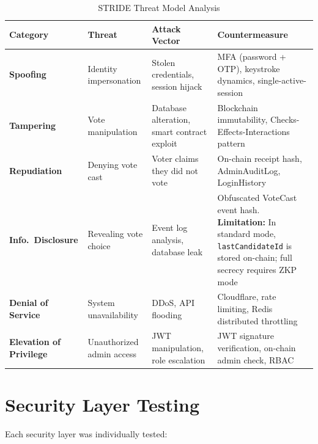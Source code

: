 \documentclass[oneside,a4paper,12pt]{book}
\begin{document}
\FloatBarrier
{}
\begin{table}[htbp]
\centering
\renewcommand{\arraystretch}{1.2}
\small
{}
\begin{tabularx}{\textwidth}{|R|M|M|X|}
\hline
\textbf{Category} & \textbf{Threat} & \textbf{Attack Vector} & \textbf{Countermeasure} \\
\hline
\textbf{Spoofing} & Identity impersonation & Stolen credentials, session hijack & MFA (password + OTP), keystroke dynamics, single-active-session \\
\hline
\textbf{Tampering} & Vote manipulation & Database alteration, smart contract exploit & Blockchain immutability, Checks-Effects-Interactions pattern \\
\hline
\textbf{Repudiation} & Denying vote cast & Voter claims they did not vote & On-chain receipt hash, AdminAuditLog, LoginHistory \\
\hline
\textbf{Info.\ Disclosure} & Revealing vote choice & Event log analysis, database leak & Obfuscated VoteCast event hash. \textbf{Limitation:} In standard mode, \texttt{lastCandidateId} is stored on-chain; full secrecy requires ZKP mode \\
\hline
\textbf{Denial of Service} & System unavailability & DDoS, API flooding & Cloudflare, rate limiting, Redis distributed throttling \\
\hline
\textbf{Elevation of Privilege} & Unauthorized admin access & JWT manipulation, role escalation & JWT signature verification, on-chain admin check, RBAC \\
\hline
\end{tabularx}
\caption{STRIDE Threat Model Analysis}
\label{tab:stride}
\end{table}

\section{Security Layer Testing}

Each security layer was individually tested:
\end{document}
